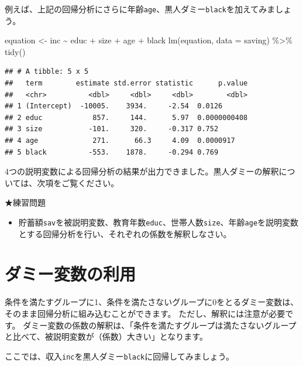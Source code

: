 \documentclass[
]{book}
\newenvironment{Shaded}{\begin{snugshade}}{\end{snugshade}}
\newcommand{\AttributeTok}[1]{\textcolor[rgb]{0.77,0.63,0.00}{#1}}
\newcommand{\FunctionTok}[1]{\textcolor[rgb]{0.00,0.00,0.00}{#1}}
\newcommand{\NormalTok}[1]{#1}
\newcommand{\OtherTok}[1]{\textcolor[rgb]{0.56,0.35,0.01}{#1}}
\newcommand{\SpecialCharTok}[1]{\textcolor[rgb]{0.00,0.00,0.00}{#1}}
\providecommand{\tightlist}{%
  \setlength{\itemsep}{0pt}\setlength{\parskip}{0pt}}
\begin{document}
例えば、上記の回帰分析にさらに年齢\texttt{age}、黒人ダミー\texttt{black}を加えてみましょう。

\begin{Shaded}
\begin{Highlighting}[]
\NormalTok{equation }\OtherTok{\textless{}{-}}\NormalTok{ inc }\SpecialCharTok{\textasciitilde{}}\NormalTok{ educ }\SpecialCharTok{+}\NormalTok{ size }\SpecialCharTok{+}\NormalTok{ age }\SpecialCharTok{+}\NormalTok{ black}
\FunctionTok{lm}\NormalTok{(equation, }\AttributeTok{data =}\NormalTok{ saving) }\SpecialCharTok{\%\textgreater{}\%}
  \FunctionTok{tidy}\NormalTok{()}
\end{Highlighting}
\end{Shaded}

\begin{verbatim}
## # A tibble: 5 x 5
##   term        estimate std.error statistic      p.value
##   <chr>          <dbl>     <dbl>     <dbl>        <dbl>
## 1 (Intercept)  -10005.    3934.     -2.54  0.0126      
## 2 educ            857.     144.      5.97  0.0000000408
## 3 size           -101.     320.     -0.317 0.752       
## 4 age             271.      66.3     4.09  0.0000917   
## 5 black          -553.    1878.     -0.294 0.769
\end{verbatim}

4つの説明変数による回帰分析の結果が出力できました。黒人ダミーの解釈については、次項をご覧ください。

★練習問題

\begin{itemize}
\tightlist
\item
  貯蓄額\texttt{sav}を被説明変数、教育年数\texttt{educ}、世帯人数\texttt{size}、年齢\texttt{age}を説明変数とする回帰分析を行い、それぞれの係数を解釈しなさい。
\end{itemize}

\hypertarget{ux30c0ux30dfux30fcux5909ux6570ux306eux5229ux7528}{%
\section{ダミー変数の利用}\label{ux30c0ux30dfux30fcux5909ux6570ux306eux5229ux7528}}

条件を満たすグループに1、条件を満たさないグループに0をとるダミー変数は、そのまま回帰分析に組み込むことができます。
ただし、解釈には注意が必要です。
ダミー変数の係数の解釈は、「条件を満たすグループは満たさないグループと比べて、被説明変数が（係数）大きい」となります。

ここでは、収入\texttt{inc}を黒人ダミー\texttt{black}に回帰してみましょう。
\end{document}
